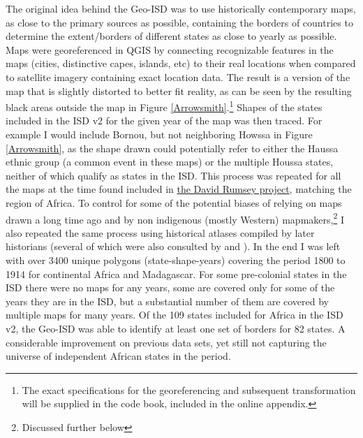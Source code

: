 \documentclass[12pt]{article}
\begin{document}
The original idea behind the Geo-ISD was to use historically contemporary maps,
as close to the primary sources as possible, containing the borders of countries
to determine the extent/borders of different states as close to yearly as
possible. Maps were georeferenced in QGIS by connecting recognizable features in
the maps (cities, distinctive capes, islands, etc) to their real locations when
compared to satellite imagery containing exact location data.  The result is a
version of the map that is slightly distorted to better fit reality, as can be
seen by the resulting black areas outside the map in Figure
\ref{Arrowsmith}.\footnote{The exact specifications for the georeferencing and
	subsequent transformation will be supplied in the code book, included in
the online appendix.} Shapes of the states included in the ISD v2 for the given
year of the map was then traced. For example I would include Bornou, but not
neighboring Howssa in Figure \ref{Arrowsmith}, as the shape drawn could
potentially refer to either the Haussa ethnic group (a common event in these
maps) or the multiple Houssa states, neither of which qualify as states in the
ISD. This process was repeated for all the maps at the time found included in
\href{https://www.davidrumsey.com}{the David Rumsey project}, matching the
region of Africa. To control for some of the potential biases of relying on maps
drawn a long time ago and by non indigenous (mostly Western)
mapmakers,\footnote{Discussed further below} I also repeated the same process
using historical atlases compiled by later historians (several of which were
also consulted by \citet{Depetris-Chauvin2016} and \citet{Paine2019}). In the
end I was left with over 3400 unique polygons (state-shape-years) covering the
period 1800 to 1914 for continental Africa and Madagascar. For some pre-colonial
states in the ISD there were no maps for any years, some are covered only for
some of the years they are in the ISD, but a substantial number of them are
covered by multiple maps for many years. Of the 109 states included for Africa
in the ISD v2, the Geo-ISD was able to identify at least one set of borders for
82 states. A considerable improvement on previous data sets, yet still not
capturing the universe of independent African states in the period.
\end{document}

